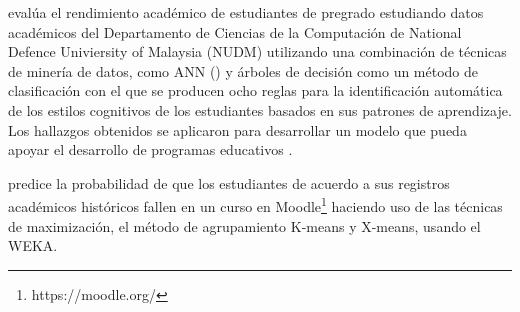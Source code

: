 \textcite{chen2008integrated} evalúa el rendimiento académico de estudiantes de pregrado estudiando datos académicos del Departamento de Ciencias de la Computación de National Defence Univiersity of Malaysia (NUDM) utilizando una combinación de técnicas de minería de datos, como ANN () y árboles de decisión como un método de clasificación con el que se producen ocho reglas para la identificación automática de los estilos cognitivos de los estudiantes basados en sus patrones de aprendizaje. Los hallazgos obtenidos se aplicaron para desarrollar un modelo que pueda apoyar el desarrollo de programas educativos .

\textcite{moreno2009data} predice la probabilidad de que los estudiantes de acuerdo a sus registros académicos históricos fallen en un curso  en Moodle\footnote{https://moodle.org/} haciendo uso de las técnicas de maximización, el método de agrupamiento K-means y X-means, usando el  WEKA.





